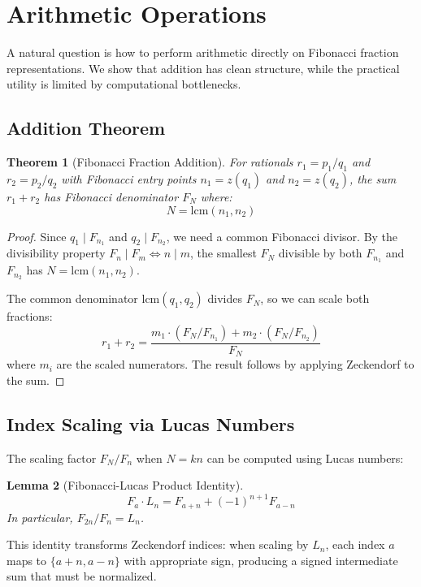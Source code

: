 \documentclass[11pt]{article}
\newtheorem{theorem}{Theorem}
\newtheorem{lemma}[theorem]{Lemma}
\begin{document}
\section{Arithmetic Operations}

A natural question is how to perform arithmetic directly on Fibonacci fraction representations. We show that addition has clean structure, while the practical utility is limited by computational bottlenecks.

\subsection{Addition Theorem}

\begin{theorem}[Fibonacci Fraction Addition]
\label{thm:addition}
For rationals $r_1 = p_1/q_1$ and $r_2 = p_2/q_2$ with Fibonacci entry points $n_1 = z(q_1)$ and $n_2 = z(q_2)$, the sum $r_1 + r_2$ has Fibonacci denominator $F_N$ where:
\[
N = \mathrm{lcm}(n_1, n_2)
\]
\end{theorem}

\begin{proof}
Since $q_1 \mid F_{n_1}$ and $q_2 \mid F_{n_2}$, we need a common Fibonacci divisor. By the divisibility property $F_n \mid F_m \iff n \mid m$, the smallest $F_N$ divisible by both $F_{n_1}$ and $F_{n_2}$ has $N = \mathrm{lcm}(n_1, n_2)$.

The common denominator $\mathrm{lcm}(q_1, q_2)$ divides $F_N$, so we can scale both fractions:
\[
r_1 + r_2 = \frac{m_1 \cdot (F_N/F_{n_1}) + m_2 \cdot (F_N/F_{n_2})}{F_N}
\]
where $m_i$ are the scaled numerators. The result follows by applying Zeckendorf to the sum.
\end{proof}

\subsection{Index Scaling via Lucas Numbers}

The scaling factor $F_N/F_n$ when $N = kn$ can be computed using Lucas numbers:

\begin{lemma}[Fibonacci-Lucas Product Identity]
\[
F_a \cdot L_n = F_{a+n} + (-1)^{n+1} F_{a-n}
\]
In particular, $F_{2n}/F_n = L_n$.
\end{lemma}

This identity transforms Zeckendorf indices: when scaling by $L_n$, each index $a$ maps to $\{a+n, a-n\}$ with appropriate sign, producing a signed intermediate sum that must be normalized.
\end{document}

